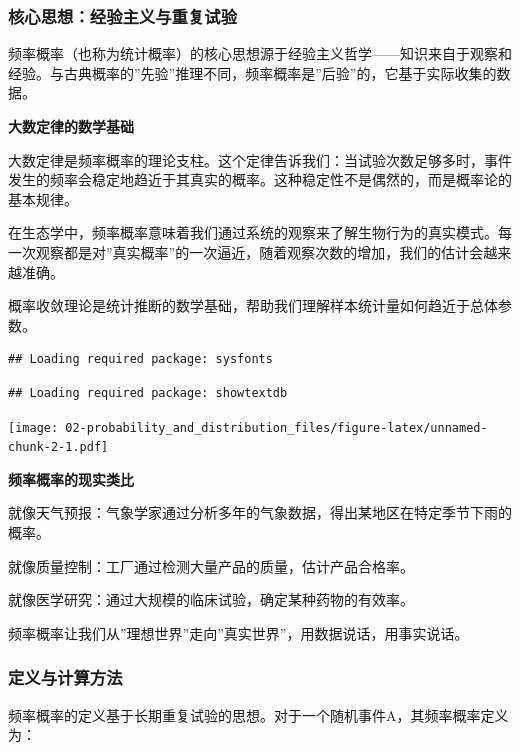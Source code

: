 \documentclass[
  twoside]{book}
\begin{document}
\hypertarget{ux6838ux5fc3ux601dux60f3ux7ecfux9a8cux4e3bux4e49ux4e0eux91cdux590dux8bd5ux9a8c}{%
\subsubsection{核心思想：经验主义与重复试验}\label{ux6838ux5fc3ux601dux60f3ux7ecfux9a8cux4e3bux4e49ux4e0eux91cdux590dux8bd5ux9a8c}}

频率概率（也称为统计概率）的核心思想源于经验主义哲学------知识来自于观察和经验。与古典概率的''先验''推理不同，频率概率是''后验''的，它基于实际收集的数据。

\textbf{大数定律的数学基础}

大数定律是频率概率的理论支柱。这个定律告诉我们：当试验次数足够多时，事件发生的频率会稳定地趋近于其真实的概率。这种稳定性不是偶然的，而是概率论的基本规律。

在生态学中，频率概率意味着我们通过系统的观察来了解生物行为的真实模式。每一次观察都是对''真实概率''的一次逼近，随着观察次数的增加，我们的估计会越来越准确。

概率收敛理论是统计推断的数学基础，帮助我们理解样本统计量如何趋近于总体参数。

\begin{verbatim}
## Loading required package: sysfonts
\end{verbatim}

\begin{verbatim}
## Loading required package: showtextdb
\end{verbatim}

\texttt{[image: 02-probability\_and\_distribution\_files/figure-latex/unnamed-chunk-2-1.pdf]}

\textbf{频率概率的现实类比}

就像天气预报：气象学家通过分析多年的气象数据，得出某地区在特定季节下雨的概率。

就像质量控制：工厂通过检测大量产品的质量，估计产品合格率。

就像医学研究：通过大规模的临床试验，确定某种药物的有效率。

频率概率让我们从''理想世界''走向''真实世界''，用数据说话，用事实说话。

\hypertarget{ux5b9aux4e49ux4e0eux8ba1ux7b97ux65b9ux6cd5}{%
\subsubsection{定义与计算方法}\label{ux5b9aux4e49ux4e0eux8ba1ux7b97ux65b9ux6cd5}}

频率概率的定义基于长期重复试验的思想。对于一个随机事件A，其频率概率定义为：
\end{document}
